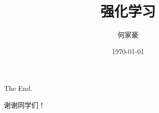 \documentclass[aspectratio=169,xcolor=dvipsnames]{beamer}
\title{强化学习}
\author{何家豪}
\institute
{
    hejiahao@ruc.edu.cn \\
    中国人民大学信息学院
}
\date{\today}
\begin{document}
\begin{frame}
    \titlepage
\end{frame}









\begin{frame}
    The End.
    
    谢谢同学们！
\end{frame}
\end{document}
